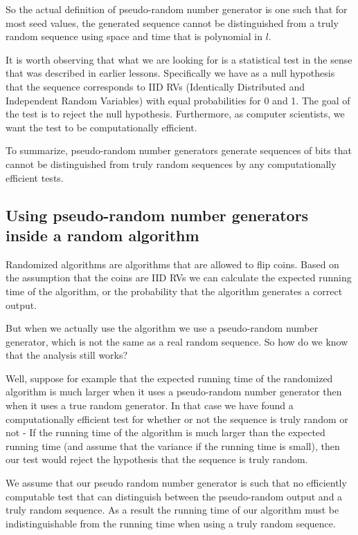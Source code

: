 So the actual definition of pseudo-random number generator is one such
that for most seed values, the generated sequence cannot be
distinguished from a truly random sequence using space and time that is
polynomial in $l$.

It is worth observing that what we are looking for is a statistical
test in the sense that was described in earlier lessons. Specifically
we have as a null hypothesis that the sequence corresponds to IID RVs
(Identically Distributed and Independent Random Variables) with equal
probabilities for 0 and 1. The goal of the test is to reject the null
hypothesis. Furthermore, as computer scientists, we want the test to
be computationally efficient.

To summarize, pseudo-random number generators generate sequences of
bits that cannot be distinguished from truly random sequences by any
computationally efficient tests.

\subsection{Using pseudo-random number generators inside a random algorithm}
Randomized algorithms are algorithms that are allowed to flip
coins. Based on the assumption that the coins are IID RVs we can
calculate the expected running time of the algorithm, or the
probability that the algorithm generates a correct output.

But when we actually use the algorithm we use a pseudo-random number
generator, which is not the same as a real random sequence. So how do
we know that the analysis still works?

Well, suppose for example that the expected running time of the
randomized algorithm is much larger when it uses a pseudo-random
number generator then when it uses a true random generator. In that
case we have found a computationally efficient test for whether or not
the sequence is truly random or not - If the running time of the
algorithm is much larger than the expected running time (and assume
that the variance if the running time is small), then our test would
reject the hypothesis that the sequence is truly random.

We assume that our pseudo random number generator is such that no
efficiently computable test that can distinguish between the
pseudo-random output and a truly random sequence. As a result the
running time of our algorithm must be indistinguishable from the
running time when using a truly random sequence.




